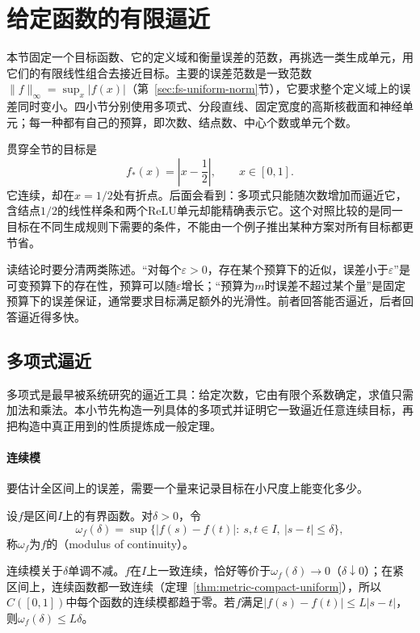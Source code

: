 
\section{给定函数的有限逼近}
\label{sec:apx-single-function}

本节固定一个目标函数、它的定义域和衡量误差的范数，再挑选一类生成单元，用它们的有限线性组合去接近目标。主要的误差范数是一致范数$\|f\|_\infty=\sup_x|f(x)|$（第~\ref{sec:fs-uniform-norm}节），它要求整个定义域上的误差同时变小。四小节分别使用多项式、分段直线、固定宽度的高斯核截面和神经单元；每一种都有自己的预算，即次数、结点数、中心个数或单元个数。

贯穿全节的目标是
\[
  f_*(x)=\left|x-\frac12\right|,\qquad x\in[0,1].
\]
它连续，却在$x=1/2$处有折点。后面会看到：多项式只能随次数增加而逼近它，含结点$1/2$的线性样条和两个ReLU单元却能精确表示它。这个对照比较的是同一目标在不同生成规则下需要的条件，不能由一个例子推出某种方案对所有目标都更节省。

读结论时要分清两类陈述。“对每个$\varepsilon>0$，存在某个预算下的近似，误差小于$\varepsilon$”是可变预算下的存在性，预算可以随$\varepsilon$增长；“预算为$m$时误差不超过某个量”是固定预算下的误差保证，通常要求目标满足额外的光滑性。前者回答能否逼近，后者回答逼近得多快。

\subsection{多项式逼近}
\label{sec:apx-polynomial}

多项式是最早被系统研究的逼近工具：给定次数，它由有限个系数确定，求值只需加法和乘法。本小节先构造一列具体的多项式并证明它一致逼近任意连续目标，再把构造中真正用到的性质提炼成一般定理。

\paragraph{连续模}

要估计全区间上的误差，需要一个量来记录目标在小尺度上能变化多少。

\begin{definition}[连续模]
\label{def:apx-modulus-of-continuity}
设$f$是区间$I$上的有界函数。对$\delta>0$，令
\[
  \omega_f(\delta)=\sup\bigl\{|f(s)-f(t)|:\ s,t\in I,\ |s-t|\le\delta\bigr\},
\]
称$\omega_f$为$f$的（modulus of continuity）。
\end{definition}

连续模关于$\delta$单调不减。$f$在$I$上一致连续，恰好等价于$\omega_f(\delta)\to0$（$\delta\downarrow0$）；在紧区间上，连续函数都一致连续（定理~\ref{thm:metric-compact-uniform}），所以$C([0,1])$中每个函数的连续模都趋于零。若$f$满足$|f(s)-f(t)|\le L|s-t|$，则$\omega_f(\delta)\le L\delta$。

